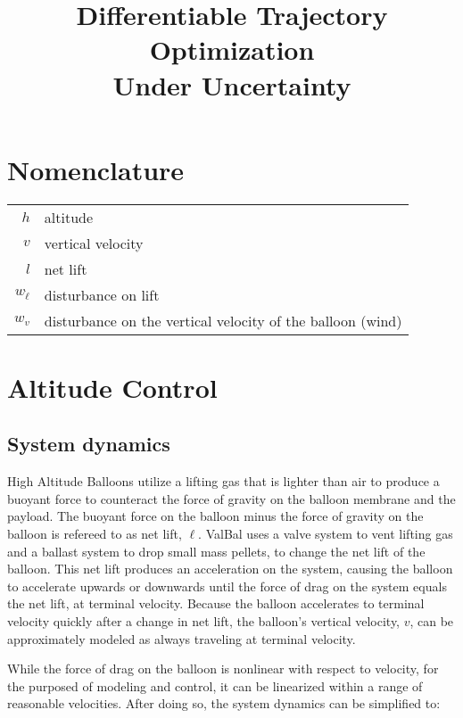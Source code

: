 \documentclass[11pt]{scrartcl} %
\title{\bfseries Differentiable Trajectory Optimization\\ Under Uncertainty}
\author{}
\date{}
\begin{document}
\maketitle

\def\States{\mathcal{S}}
\def\Altitudes{\mathcal{H}}
\def\Velocities{\mathcal{V}}
\def\Lifts{\mathcal{L}}
\newcommand{\mx}[2]{\left[ \begin{array}{#1} #2 \end{array} \right]}

\section{Nomenclature}
\begin{tabular}{rl}
$h$ & altitude  \\
$v$ & vertical velocity\\
$l$ & net lift \\
$w_{\dot \ell}$ & disturbance on lift \\
$w_{v}$ & disturbance on the vertical velocity of the balloon (wind) \\
\end{tabular}

\section{Altitude Control}
\subsection{System dynamics}

High Altitude Balloons utilize a lifting gas that is lighter than air to produce a buoyant force to counteract the force of gravity on the balloon membrane and the payload. The buoyant force on the balloon minus the force of gravity on the balloon is refereed to as net lift, $\ell$. ValBal uses a valve system to vent lifting gas and a ballast system to drop small mass pellets, to change the net lift of the balloon. This net lift produces an acceleration on the system, causing the balloon to accelerate upwards or downwards until the force of drag on the system equals the net lift, at terminal velocity. Because the balloon accelerates to terminal velocity quickly after a change in net lift, the balloon's vertical velocity, $v$, can be approximately modeled as always traveling at terminal velocity.

While the force of drag on the balloon is nonlinear with respect to velocity, for the purposed of modeling and control, it can be linearized within a range of reasonable velocities. After doing so, the system dynamics can be simplified to:
\end{document}
